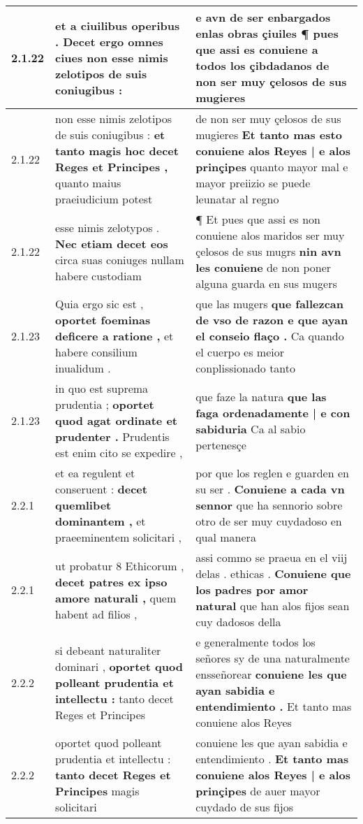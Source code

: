 \begin{tabular}{|p{1cm}|p{6.5cm}|p{6.5cm}|}
2.1.22 & et a ciuilibus operibus . \textbf{ Decet ergo omnes ciues } non esse nimis zelotipos de suis coniugibus : & e avn de ser enbargados enlas obras çiuiles ¶ \textbf{ pues que assi es conuiene a todos los çibdadanos } de non ser muy çelosos de sus mugieres \\\hline
2.1.22 & non esse nimis zelotipos de suis coniugibus : \textbf{ et tanto magis hoc decet Reges et Principes , } quanto maius praeiudicium potest & de non ser muy çelosos de sus mugieres \textbf{ Et tanto mas esto conuiene alos Reyes | e alos prinçipes } quanto mayor mal e mayor preiizio se puede leunatar al regno \\\hline
2.1.22 & esse nimis zelotypos . \textbf{ Nec etiam decet eos } circa suas coniuges nullam habere custodiam & ¶ Et pues que assi es non conuiene alos maridos ser muy çelosos de sus mugrs \textbf{ nin avn les conuiene } de non poner alguna guarda en sus mugers \\\hline
2.1.23 & Quia ergo sic est , \textbf{ oportet foeminas deficere a ratione , } et habere consilium inualidum . & que las mugers \textbf{ que fallezcan de vso de razon e que ayan el conseio flaço . } Ca quando el cuerpo es meior conplissionado tanto \\\hline
2.1.23 & in quo est suprema prudentia ; \textbf{ oportet quod agat ordinate et prudenter . } Prudentis est enim cito se expedire , & que faze la natura \textbf{ que las faga ordenadamente | e con sabiduria } Ca al sabio pertenesçe \\\hline
2.2.1 & et ea regulent et conseruent : \textbf{ decet quemlibet dominantem , } et praeeminentem solicitari , & por que los reglen e guarden en su ser . \textbf{ Conuiene a cada vn sennor } que ha sennorio sobre otro de ser muy cuydadoso en qual manera \\\hline
2.2.1 & ut probatur 8 Ethicorum , \textbf{ decet patres ex ipso amore naturali , } quem habent ad filios , & assi commo se praeua en el viij delas . ethicas . \textbf{ Conuiene que los padres por amor natural } que han alos fijos sean cuy dadosos della \\\hline
2.2.2 & si debeant naturaliter dominari , \textbf{ oportet quod polleant prudentia et intellectu : } tanto decet Reges et Principes & e generalmente todos los señores sy de una naturalmente ensseñorear \textbf{ conuiene les que ayan sabidia e entendimiento . } Et tanto mas conuiene alos Reyes \\\hline
2.2.2 & oportet quod polleant prudentia et intellectu : \textbf{ tanto decet Reges et Principes } magis solicitari & conuiene les que ayan sabidia e entendimiento . \textbf{ Et tanto mas conuiene alos Reyes | e alos prinçipes } de auer mayor cuydado de sus fijos \\\hline

\end{tabular}

